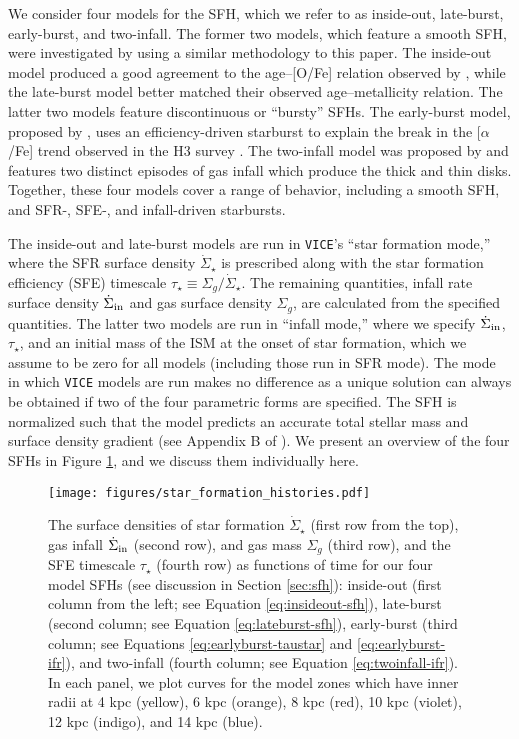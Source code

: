 \documentclass[twocolumn,twocolappendix,linenumbers]{aastex631}
\newcommand{\aFe}{[$\alpha$/Fe]\xspace}
\newcommand{\vice}{{\tt VICE}\xspace}
\begin{document}
We consider four models for the SFH, which we refer to as inside-out, late-burst, early-burst, and two-infall. 
The former two models, which feature a smooth SFH, were investigated by  using a similar methodology to this paper. The inside-out model produced a good agreement to the age--[O/Fe] relation observed by \citet{Feuillet2019-MilkyWayAges}, while the late-burst model better matched their observed age--metallicity relation. The latter two models feature discontinuous or ``bursty'' SFHs. The early-burst model, proposed by \citet{Conroy2022-ThickDisk}, uses an efficiency-driven starburst to explain the break in the \aFe trend observed in the H3 survey \citep{Conroy2019-H3Survey}. The two-infall model was proposed by \citet{Chiappini1997-TwoInfall} and features two distinct episodes of gas infall which produce the thick and thin disks.
Together, these four models cover a range of behavior, including a smooth SFH, and SFR-, SFE-, and infall-driven starbursts.

The inside-out and late-burst models are run in \vice's ``star formation mode,'' where the SFR surface density $\dot\Sigma_\star$ is prescribed along with the star formation efficiency (SFE) timescale $\tau_\star\equiv \Sigma_g/\dot\Sigma_\star$. The remaining quantities, infall rate surface density $\dot\Sigma_{\rm in}$ and gas surface density $\Sigma_g$, are calculated from the specified quantities. The latter two models are run in ``infall mode,'' where we specify $\dot\Sigma_{\rm in}$, $\tau_\star$, and an initial mass of the ISM at the onset of star formation, which we assume to be zero for all models (including those run in SFR mode). The mode in which \vice models are run makes no difference as a unique solution can always be obtained if two of the four parametric forms are specified. The SFH is normalized such that the model predicts an accurate total stellar mass and surface density gradient (see Appendix B of ).
We present an overview of the four SFHs in Figure \ref{fig:sfhs}, and we discuss them individually here.

\begin{figure*}
    \centering
    \texttt{[image: figures/star\_formation\_histories.pdf]}
    \caption{The surface densities of star formation $\dot \Sigma_\star$ (first row from the top), gas infall $\dot \Sigma_{\rm in}$ (second row), and gas mass $\Sigma_g$ (third row), and the SFE timescale $\tau_\star$ (fourth row) as functions of time for our four model SFHs (see discussion in Section \ref{sec:sfh}): inside-out (first column from the left; see Equation \ref{eq:insideout-sfh}), late-burst (second column; see Equation \ref{eq:lateburst-sfh}), early-burst (third column; see Equations \ref{eq:earlyburst-taustar} and \ref{eq:earlyburst-ifr}), and two-infall (fourth column; see Equation \ref{eq:twoinfall-ifr}). In each panel, we plot curves for the model zones which have inner radii at 4 kpc (yellow), 6 kpc (orange), 8 kpc (red), 10 kpc (violet), 12 kpc (indigo), and 14 kpc (blue).}
    \label{fig:sfhs}
\end{figure*}
\end{document}
